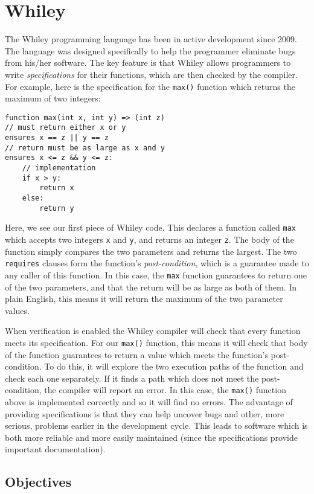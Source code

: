 \section{Whiley}
The Whiley programming language has been in active development since
2009.  The language was designed specifically to help the programmer
eliminate bugs from his/her software.  The key feature is that Whiley
allows programmers to write {\em specifications} for their functions,
which are then checked by the compiler.  For example, here is the
specification for the \lstinline{max()} function which returns the
maximum of two integers:

\begin{lstlisting}
function max(int x, int y) => (int z)
// must return either x or y
ensures x == z || y == z
// return must be as large as x and y
ensures x <= z && y <= z:
    // implementation
    if x > y:
        return x
    else:
        return y
\end{lstlisting}

Here, we see our first piece of Whiley code.  This declares a function
called \lstinline{max} which accepts two integers \lstinline{x} and
\lstinline{y}, and returns an integer \lstinline{z}.  The body of the
function simply compares the two parameters and returns the largest.
The two \lstinline{requires} clauses form the function's {\em
  post-condition}, which is a guarantee made to any caller of this
function.  In this case, the \lstinline{max} function guarantees to
return one of the two parameters, and that the return will be as large
as both of them.  In plain English, this means it will return the
maximum of the two parameter values.

When verification is enabled the Whiley compiler will check that every
function meets its specification.  For our \lstinline{max()} function,
this means it will check that body of the function guarantees to
return a value which meets the function's post-condition.  To do this,
it will explore the two execution paths of the function and check each
one separately.  If it finds a path which does not meet the
post-condition, the compiler will report an error.  In this case, the
\lstinline{max()} function above is implemented correctly and so it
will find no errors.  The advantage of providing specifications is
that they can help uncover bugs and other, more serious, problems
earlier in the development cycle.  This leads to software which is
both more reliable and more easily maintained (since the
specifications provide important documentation).

\subsection{Objectives}
